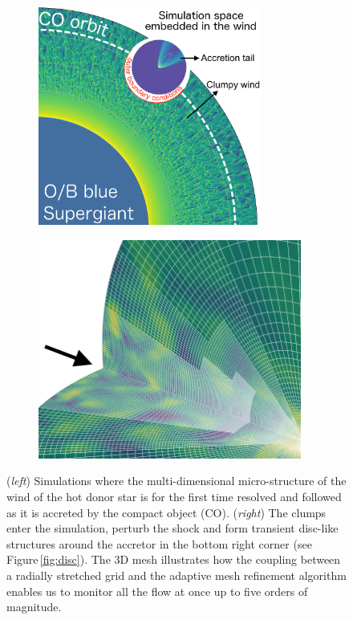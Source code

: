 \documentclass[11pt,onecolumn]{article}
\begin{document}
\begin{figure}[!h]
  \hspace*{-2.2cm}
\begin{subfigure}{0.45\columnwidth}
  \includegraphics[height=7.2cm]{Figures/config_SgXB_clumps.png}	
\end{subfigure}%
\begin{subfigure}{0.45\columnwidth}
  \hspace*{0.7cm}
  \includegraphics[height=7.2cm]{Figures/mesh.jpeg}	
\end{subfigure}
\caption{(\textit{left}) Simulations where the multi-dimensional micro-structure of the wind of the hot donor star is for the first time resolved and followed as it is accreted by the compact object (CO). (\textit{right}) The clumps enter the simulation, perturb the shock and form transient disc-like structures around the accretor in the bottom right corner (see Figure\,\ref{fig:disc}). The 3D mesh illustrates how the coupling between a radially stretched grid and the adaptive mesh refinement algorithm enables us to monitor all the flow at once up to five orders of magnitude.}
\label{fig:config_SgXB_and_mesh}
\end{figure}
\end{document}
